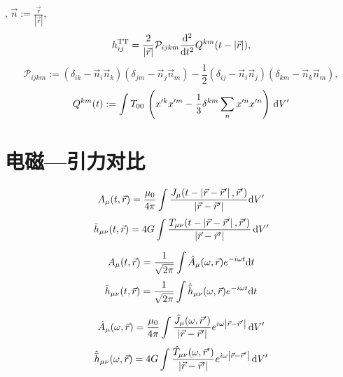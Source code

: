 \cite{Blanchet1997}, $\vec{n}:=\frac{\vec{r}}{\left\lvert\vec{r}\right\rvert}$,
\begin{equation}
    h_{ij}^{\text{TT}}=\frac{2}{\left\lvert\vec{r}\right\rvert}\mathcal{P}_{ijkm}\frac{\mathrm{d}^2}{\mathrm{d} t^2}{Q}^{km}(t-\left\lvert\vec{r}\right\rvert), \label{TT}
\end{equation}
\begin{equation}
    \mathcal{P}_{ijkm}:=
    \left(\delta_{ik} -\vec{n}_i\vec{n}_k\right)
    \left(\delta_{jm} -\vec{n}_j\vec{n}_m\right)
    -\frac{1}{2}
    \left(\delta_{ij} -\vec{n}_i\vec{n}_j\right)
    \left(\delta_{km} -\vec{n}_k\vec{n}_m\right),
\end{equation}
\begin{equation}
    Q^{km}(t):=\int{T}_{00}\,\left(x'^kx'^m-\frac{1}{3}\delta^{km}\sum_nx'^nx'^n\right)\,\mathrm{d} V'
\end{equation}

\section{电磁---引力对比}

\begin{equation}
    A_\mu(t,\vec{r})=\frac{\mu_0}{4\pi}\int\frac{J_\mu(t-\left\lvert \vec{r}-\vec{r}'\right\rvert ,\vec{r}')}{\left\lvert \vec{r}-\vec{r}'\right\rvert}\mathrm{d} V'
\end{equation}
\begin{equation}
    \bar{h}_{\mu\nu}(t,\vec{r})=4G\int\frac{T_{\mu\nu}(t-\left\lvert\vec{r}-\vec{r}'\right\rvert,\vec{r}')}{\left\lvert\vec{r}-\vec{r}'\right\rvert}\,\mathrm{d} V'
\end{equation}

\begin{equation}
    A_\mu(t,\vec{r})=\frac{1}{\sqrt{2\pi}}
    \int\hat{A}_{\mu}(\omega,\vec{r})e^{-i\omega t}\mathrm{d} t
\end{equation}
\begin{equation}
    \bar{h}_{\mu\nu}(t,\vec{r})=\frac{1}{\sqrt{2\pi}}
    \int\hat{\bar{h}}_{\mu\nu}(\omega,\vec{r})e^{-i\omega t}\mathrm{d} t
\end{equation}

\begin{equation}
    \hat{A}_{\mu}(\omega,\vec{r})=\frac{\mu_0}{4\pi}\int\frac{\hat{J}_{\mu}(\omega,\vec{r}')}{\left\lvert\vec{r}-\vec{r}'\right\rvert}e^{i\omega\left\lvert\vec{r}-\vec{r}'\right\rvert}\,\mathrm{d} V'
\end{equation}
\begin{equation}
    \hat{\bar{h}}_{\mu\nu}(\omega,\vec{r})=4G\int\frac{\hat{T}_{\mu\nu}(\omega,\vec{r}')}{\left\lvert\vec{r}-\vec{r}'\right\rvert}e^{i\omega\left\lvert\vec{r}-\vec{r}'\right\rvert}\,\mathrm{d} V'
\end{equation}

